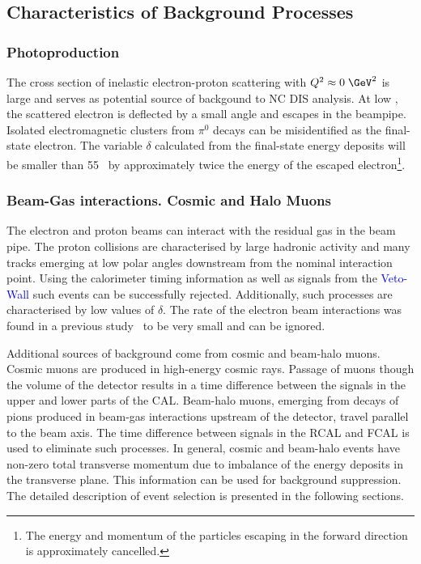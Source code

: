 \subsection{Characteristics of Background Processes}
\label{subsec:bgchar}

\subsubsection{Photoproduction}
\label{subsubsec:photoprodbg}
The cross section of inelastic electron-proton scattering with $\qsq \approx 0\;\GeV^2$ is large and serves as potential source of backgound to NC DIS analysis. At low \qsq, the scattered electron is deflected by a small angle and escapes in the beampipe. Isolated electromagnetic clusters from $\pi^0$ decays can be misidentified as the final-state electron. The variable $\delta$ calculated from the final-state energy deposits will be smaller than 55 \GeV~by approximately twice the energy of the escaped electron\footnote{The energy and momentum of the particles escaping in the forward direction is approximately cancelled.}.

\subsubsection{Beam-Gas interactions. Cosmic and Halo Muons}
\label{subsubsec:beamgasfeatures}
The electron and proton beams can interact with the residual gas in the beam pipe. The proton collisions are characterised by large hadronic activity and many tracks emerging at low polar angles downstream from the nominal interaction point. Using the calorimeter timing information as well as signals from the \textcolor{blue}{Veto-Wall} such events can be successfully rejected. Additionally, such processes are characterised by low values of $\delta$. The rate of the electron beam interactions was found in a previous study~\cite{thesis:moritz:2001} to be very small and can be ignored.

Additional sources of background come from cosmic and beam-halo muons. Cosmic muons are produced in high-energy cosmic rays. Passage of muons though the volume of the detector results in a time difference between the signals in the upper and lower parts of the CAL. Beam-halo muons, emerging from decays of pions produced in beam-gas interactions upstream of the detector, travel parallel to the beam axis. The time difference between signals in the RCAL and FCAL is used to eliminate such processes. In general, cosmic and beam-halo events have non-zero total transverse momentum due to imbalance of the energy deposits in the transverse plane. This information can be used for background suppression. The detailed description of event selection is presented in the following sections.

